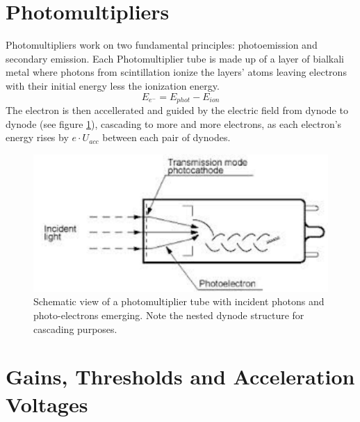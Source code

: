   \section{Photomultipliers}
  \label{ch:The muon detection system:sec:Photomultipliers}
  Photomultipliers work on two fundamental principles: photoemission and secondary emission.
  Each Photomultiplier tube is made up of a layer of bialkali metal where photons from scintillation ionize the layers' atoms leaving electrons with their initial energy less the ionization energy.
  $$E_{e^-} = E_{phot} - E_{ion}$$
  The electron is then accellerated and guided by the electric field from dynode to dynode (see figure \ref{fig:PMT}), cascading to more and more electrons, as each electron's energy rises by $e\cdot U_{acc}$ between each pair of dynodes.
  \begin{figure}
  	\centering
  	\includegraphics[width = 0.5 \textwidth]{graphics/setup/PMT.pdf}
  	\caption[Photomultiplier tube]{Schematic view of a photomultiplier tube with incident photons and photo-electrons emerging. Note the nested dynode structure for cascading purposes.}
  	\label{fig:PMT}
  \end{figure}

  
  
  \section{Gains, Thresholds and Acceleration Voltages}
  \label{ch:The muon detection system:sec:Gains, Thresholds and Acceleration Voltages}

